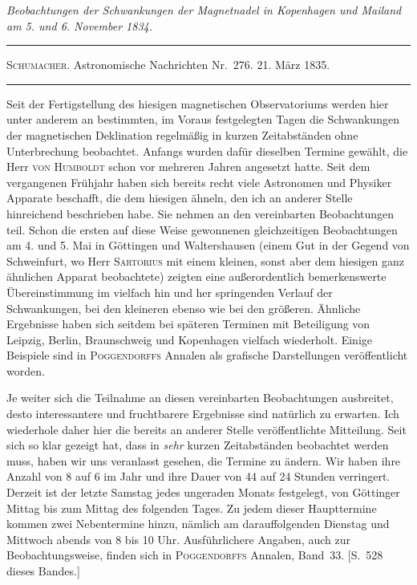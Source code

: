 \begin{center}\itshape
Beobachtungen der Schwankungen der Magnetnadel in Kopenhagen und Mailand\\
am 5. und 6. November 1834.
\end{center}
\begin{center}
\hrule\vspace{2mm}
\textsc{Schumacher}. Astronomische Nachrichten Nr.\ 276. 21. März 1835.
\vspace{2mm}\hrule\vspace{5mm}
\end{center}
Seit der Fertigstellung des hiesigen magnetischen Observatoriums werden hier unter anderem an bestimmten, im Voraus festgelegten Tagen die Schwankungen der magnetischen Deklination regelmäßig in kurzen Zeitabständen ohne Unterbrechung beobachtet. Anfangs wurden dafür dieselben Termine gewählt, die Herr \textsc{von Humboldt} schon vor mehreren Jahren angesetzt hatte. Seit dem vergangenen Frühjahr haben sich bereits recht viele Astronomen und Physiker Apparate beschafft, die dem hiesigen ähneln, den ich an anderer Stelle hinreichend beschrieben habe. Sie nehmen an den vereinbarten Beobachtungen teil. Schon die ersten auf diese Weise gewonnenen gleichzeitigen Beobachtungen am 4. und 5. Mai in Göttingen und Waltershausen (einem Gut in der Gegend von Schweinfurt, wo Herr \textsc{Sartorius} mit einem kleinen, sonst aber dem hiesigen ganz ähnlichen Apparat beobachtete) zeigten eine außerordentlich bemerkenswerte Übereinstimmung im vielfach hin und her springenden Verlauf der Schwankungen, bei den kleineren ebenso wie bei den größeren. Ähnliche Ergebnisse haben sich seitdem bei späteren Terminen mit Beteiligung von Leipzig, Berlin, Braunschweig und Kopenhagen vielfach wiederholt. Einige Beispiele sind in \textsc{Poggendorffs} Annalen als grafische Darstellungen veröffentlicht worden.

Je weiter sich die Teilnahme an diesen vereinbarten Beobachtungen ausbreitet, desto interessantere und fruchtbarere Ergebnisse sind natürlich zu erwarten. Ich wiederhole daher hier die bereits an anderer Stelle veröffentlichte Mitteilung. Seit sich so klar gezeigt hat, dass in \textit{sehr} kurzen Zeitabständen beobachtet werden muss, haben wir uns veranlasst gesehen, die Termine zu ändern. Wir haben ihre Anzahl von 8 auf 6 im Jahr und ihre Dauer von 44 auf 24 Stunden verringert. Derzeit ist der letzte Samstag jedes ungeraden Monats festgelegt, von Göttinger Mittag bis zum Mittag des folgenden Tages. Zu jedem dieser Haupttermine kommen zwei Nebentermine hinzu, nämlich am
darauffolgenden Dienstag und Mittwoch abends von 8 bis 10 Uhr. Ausführlichere Angaben, auch zur Beobachtungsweise, finden sich in \textsc{Poggendorffs} Annalen, Band~33. [S.\ 528 dieses Bandes.]

